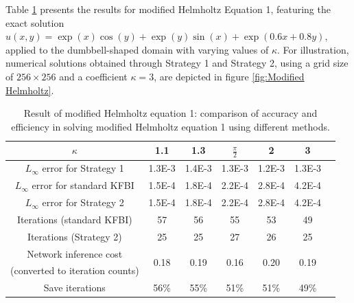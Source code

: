 \documentclass{article}
\begin{document}
Table \ref{label3_1_1} presents the results for modified Helmholtz Equation 1, featuring the exact solution \(u(x, y) = \exp(x) \cos(y) + \exp(y) \sin(x) + \exp(0.6x + 0.8y)\), applied to the dumbbell-shaped domain with varying values of $\kappa$. For illustration, numerical solutions obtained through Strategy 1 and Strategy 2, using a grid size of $256 \times 256$ and a coefficient $\kappa = 3$, are depicted in figure \ref{fig:Modified Helmholtz}.
\begin{table}[ht]
    \centering
    \begin{tabular}{|c|c|c|c|c|c|c|} \hline 
         $\kappa $ & 1.1 & 1.3& $\frac{\pi}{2}$ & 2 & 3 \\ \hline 
         $L_{\infty}$ error for Strategy 1 & 1.3E-3 & 1.4E-3 & 1.3E-3 & 1.2E-3 & 1.3E-3  \\ \hline
         $L_{\infty}$ error for standard KFBI & 1.5E-4 & 1.8E-4 & 2.2E-4 & 2.8E-4 & 4.2E-4  \\ \hline
         $L_{\infty}$ error for Strategy 2 & 1.5E-4 & 1.8E-4 & 2.2E-4 & 2.8E-4 & 4.2E-4 \\ \hline
         Iterations (standard KFBI) & 57 & 56 & 55 & 53 & 49 \\ \hline 
         Iterations (Strategy 2) & 25 & 25 & 27 & 26 & 25 \\ \hline 
         
         Network inference cost
         & \multirow{2}{*}{0.18\bigstrut}
         & \multirow{2}{*}{0.19\bigstrut}
         & \multirow{2}{*}{0.16\bigstrut}
         & \multirow{2}{*}{0.20\bigstrut}
         & \multirow{2}{*}{0.19\bigstrut} \\
         (converted to iteration counts) & & & & & \\ \hline
         
         Save iterations & 56\% & 55\% & 51\% & 51\% & 49\% \\ \hline
    \end{tabular}
    \caption{Result of modified Helmholtz equation 1: comparison of accuracy and efficiency in solving modified Helmholtz equation 1 using different methods.}
    \label{label3_1_1}
\end{table}
\end{document}
